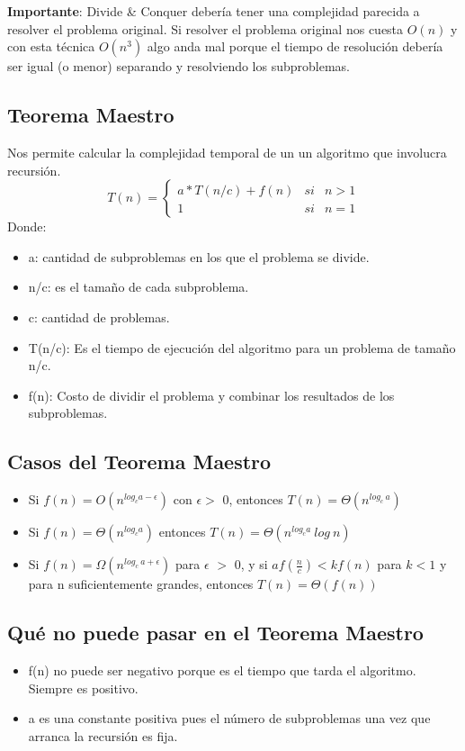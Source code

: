 \documentclass[10pt,a4paper]{article}
\begin{document}
\textbf{Importante}: Divide \& Conquer debería tener una complejidad parecida a resolver el problema original. Si resolver el problema original nos cuesta $O(n)$ y con esta técnica $O(n^{3})$ algo anda mal porque el tiempo de resolución debería ser igual (o menor) separando y resolviendo los subproblemas.
\subsection*{Teorema Maestro}
Nos permite calcular la complejidad temporal de un un algoritmo que involucra recursión.
\[T(n) = \left\{ \begin{array}{lcc} a \ast T(n/c) + f(n) & si & n>1  \\ 1 & si & n=1 \end{array} \right.\]
Donde: 
\begin{itemize}
    \item a: cantidad de subproblemas en los que el problema se divide.
    \item n/c: es el tamaño de cada subproblema.
    \item c: cantidad de problemas.
    \item T(n/c): Es el tiempo de ejecución del algoritmo para un problema de tamaño n/c.
    \item f(n): Costo de dividir el problema y combinar los resultados de los subproblemas.
\end{itemize}
\subsection*{Casos del Teorema Maestro}
\begin{itemize}
    \item Si $f(n) = O(n^{log_{c} a-\epsilon})$ con $\epsilon >$ 0, entonces $T(n) = \Theta(n^{log_{c} \ a})$
    \item Si $f(n) = \Theta(n^{log_{c} a})$ entonces $T(n) = \Theta(n^{log_{c} a} \ log \ n)$
    \item Si $f(n) = \Omega(n^{log_{c} \ a + \epsilon})$ para $\epsilon$ $>$ 0, y si $ af(\frac{n}{c}) < kf(n)$ para $k<1$ y para n suficientemente grandes, entonces $T(n) = \Theta(f(n))$
\end{itemize}
\subsection*{Qué no puede pasar en el Teorema Maestro}
\begin{itemize}
    \item f(n) no puede ser negativo porque es el tiempo que tarda el algoritmo. Siempre es positivo.
    \item a es una constante positiva pues el número de subproblemas una vez que arranca la recursión es fija.
\end{itemize}
\end{document}
